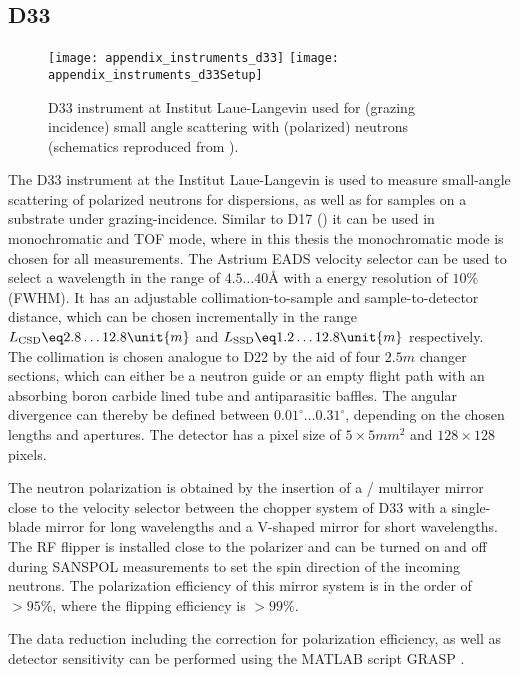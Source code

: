 \documentclass[\main/dresen_thesis.tex]{subfiles}
\begin{document}
  \subsection{D33}\label{ch:lss:d33}
    \begin{figure}[ht]
      \centering
      \texttt{[image: appendix\_instruments\_d33]}
      \texttt{[image: appendix\_instruments\_d33Setup]}
      \caption{\label{fig:lss:d33}D33 instrument at Institut Laue-Langevin used for (grazing incidence) small angle scattering with (polarized) neutrons (schematics reproduced from \cite{Dewhurst_2015_Thesm}).}
    \end{figure}
    The D33 instrument \cite{Dewhurst_2015_Thesm} at the Institut Laue-Langevin is used to measure small-angle scattering of polarized neutrons for dispersions, as well as for samples on a substrate under grazing-incidence.
    Similar to D17 () it can be used in monochromatic and TOF mode, where in this thesis the monochromatic mode is chosen for all measurements.
    The Astrium EADS velocity selector can be used to select a wavelength in the range of $4.5 \ldots 40 \unit{\angstrom}$ with a energy resolution of $10 \unit{\%}$ (FWHM).
    It has an adjustable collimation-to-sample and sample-to-detector distance, which can be chosen incrementally in the range $L_\mathrm{CSD} \eq 2.8 \ldots 12.8 \unit{m}$ and $L_\mathrm{SSD} \eq 1.2 \ldots 12.8 \unit{m}$ respectively.
    The collimation is chosen analogue to D22 by the aid of four $2.5 \unit{m}$ changer sections, which can either be a neutron guide or an empty flight path with an absorbing boron carbide lined tube and antiparasitic baffles.
    The angular divergence can thereby be defined between $0.01^\circ \ldots 0.31^\circ$, depending on the chosen lengths and apertures.
    The detector has a pixel size of $5 \times 5 \unit{mm^2}$ and $128 \times 128$ pixels.

    The neutron polarization is obtained by the insertion of a / multilayer mirror close to the velocity selector between the chopper system of D33 with a single-blade mirror for long wavelengths and a V-shaped mirror for short wavelengths.
    The RF flipper is installed close to the polarizer and can be turned on and off during SANSPOL measurements to set the spin direction of the incoming neutrons.
    The polarization efficiency of this mirror system is in the order of $>95 \unit{\%}$, where the flipping efficiency is $>99 \unit{\%}$.

    The data reduction including the correction for polarization efficiency, as well as detector sensitivity can be performed using the MATLAB script GRASP \cite{Dewhurst_2003_Grasp}.
\end{document}
